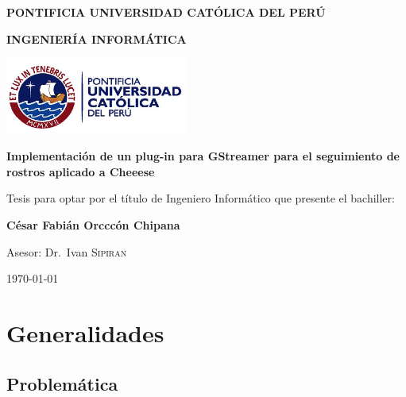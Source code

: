 \documentclass[a4paper,openright,12pt]{report}
\begin{document}
\begin{titlepage}
	\centering

	{\sffamily\large\bfseries PONTIFICIA UNIVERSIDAD CATÓLICA DEL PERÚ \par}
	\vspace{0.2cm}
	{\sffamily\large\bfseries INGENIERÍA INFORMÁTICA\par}
	\vfill

	\includegraphics[width=6cm]{../images/logo-pucp.png}\par\vspace{1cm}
	\vspace{1.5cm}

	{\sffamily\large\bfseries Implementación de un plug-in para GStreamer para
	el seguimiento de rostros aplicado a Cheeese\par}
	\vspace{2cm}

	{\sffamily\small Tesis para optar por el título de Ingeniero Informático que presente el
	bachiller: }

	{\sffamily\Large\bf	César Fabián Orcccón Chipana \par}
	{ \par}
	\vfill
	{\sffamily Asesor: Dr.~Ivan \textsc{Sipiran} \par}

	\vfill

	{\sffamily\large \today\par}
\end{titlepage}



\tableofcontents
\chapter{Generalidades}
\section{Problemática}
\end{document}
